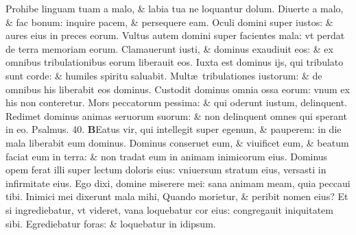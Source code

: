 \documentclass[a5paper,10pt]{book}
\def\ae{æ}
\begin{document}
\begin{multicols*}{2}
\newline \color{red} P\color{black}rohibe linguam tuam a malo, \& labia tua ne loquantur dolum.
\newline \color{red} D\color{black}iuerte a malo, \& fac bonum: inquire pacem, \& persequere eam.
\newline \color{red} O\color{black}culi domini super iustos: \& aures eius in preces eorum.
\newline \color{red} V\color{black}ultus autem domini super facientes mala: vt perdat de terra memoriam eorum.
\newline \color{red} C\color{black}lamauerunt iusti, \& dominus exaudiuit eos: \& ex omnibus tribulationibus eorum liberauit eos.
\newline \color{red} I\color{black}uxta est dominus ijs, qui tribulato sunt corde: \& humiles spiritu saluabit.
\newline \color{red} M\color{black}ult\ae \ tribulationes iustorum: \& de omnibus his liberabit eos dominus.
\newline \color{red} C\color{black}ustodit dominus omnia ossa eorum: vnum ex his non conteretur.
\newline \color{red} M\color{black}ors peccatorum pessima: \& qui oderunt iustum, delinquent.
\newline \color{red} R\color{black}edimet dominus animas seruorum suorum: \& non delinquent omnes qui sperant in eo. \quad \color{red} Psalmus. \hypertarget{ps40}{40.} \color{black}
\vspace{-1em}
\lettrine[lines=2]{\bfseries \color{red} B}{}Eatus vir, qui intellegit super egenum, \& pauperem: in die mala liberabit eum dominus.%
\newline \color{red} D\color{black}ominus conseruet eum, \& viuificet eum, \& beatum faciat eum in terra: \& non tradat eum in animam inimicorum eius.
\newline \color{red} D\color{black}ominus opem ferat illi super lectum doloris eius: vniuersum stratum eius, versasti in infirmitate eius.
\newline \color{red} E\color{black}go dixi, domine miserere mei: sana animam meam, quia peccaui tibi.
\newline \color{red} I\color{black}nimici mei dixerunt mala mihi, Quando morietur, \& peribit nomen eius?
\newline \color{red} E\color{black}t si ingrediebatur, vt videret, vana loquebatur cor eius: congregauit iniquitatem sibi.
\newline \color{red} E\color{black}grediebatur foras: \& loquebatur in idipsum.

\end{multicols*}
\end{document}
